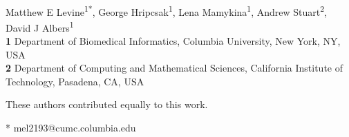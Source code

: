 \documentclass[10pt,letterpaper]{article}
\date{}
\begin{document}
\vspace*{0.2in}

\begin{flushleft}
{\Large
\textbf{} %
}
\newline
\\
Matthew E Levine\textsuperscript{1*},
George Hripcsak\textsuperscript{1},
Lena Mamykina\textsuperscript{1},
Andrew Stuart\textsuperscript{2\ddag},
David J Albers\textsuperscript{1\ddag}
\\
\bigskip
\textbf{1} Department of Biomedical Informatics, Columbia University, New York, NY, USA
\\
\textbf{2} Department of Computing and Mathematical Sciences, California Institute of Technology, Pasadena, CA, USA
\\
\bigskip

% 
%

\ddag These authors contributed equally to this work.




* mel2193@cumc.columbia.edu

\end{flushleft}
\end{document}
